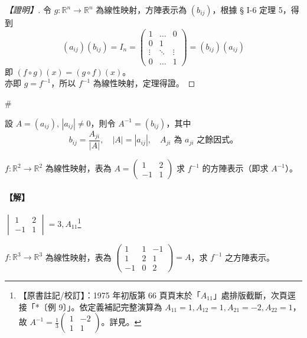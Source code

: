 \begin{proof}[【證明】]
令 $g: \mathbb{R}^n \longrightarrow \mathbb{R}^n$ 為線性映射，方陣表示為 $(b_{ij})$，根據 § I-6 定理 5，得到
\begin{equation}
(a_{ij})(b_{ij}) = I_n = \begin{pmatrix}
1 & \dots & 0 \\
0 & 1 & \\
\vdots & \ddots & \vdots \\
0 & \dots & 1
\end{pmatrix} = (b_{ij})(a_{ij}) \label{eq:b6s-1-7-10}
\end{equation}
即 $(f \circ g)(x) = (g \circ f)(x)$。\\
亦即 $g = f^{-1}$，所以 $f^{-1}$ 為線性映射，定理得證。
\end{proof}\hfill$\#$

\begin{definition*}\label{def:b6s-1-11}
設 $A=(a_{ij}),\, |a_{ij}| \ne 0$，則令 $A^{-1} = (b_{ij})$，其中
\[ b_{ij} = \dfrac{A_{ji}}{|A|},\quad |A|=|a_{ij}|,\quad A_{ji} \text{ 為 } a_{ji} \text{ 之餘因式。} \]
\end{definition*}

\begin{example}\label{ex:b6s-1-39b}
$f: \mathbb{R}^2 \longrightarrow \mathbb{R}^2$ 為線性映射，表為 $A = \begin{pmatrix} 1 & 2 \\ -1 & 1 \end{pmatrix}$ 求 $f^{-1}$ 的方陣表示（即求 $A^{-1}$）。
\end{example}

\paragraph{【解】}
$\begin{vmatrix} 1 & 2 \\ -1 & 1 \end{vmatrix} = 3, A_{11}$\label{note:b6s-ch1-p66-ex8}\footnote{【原書註記/校訂】：1975 年初版第 66 頁頁末於「$A_{11}$」處排版截斷，次頁逕接「*〔例 9〕」。依定義補記完整演算為 $A_{11}=1, A_{12}=1, A_{21}=-2, A_{22}=1$，故 $A^{-1} = \frac{1}{3}\begin{pmatrix} 1 & -2 \\ 1 & 1 \end{pmatrix}$。詳見\errataref。}

\begin{example}[*]\label{ex:b6s-1-40}
$f: \mathbb{R}^3 \longrightarrow \mathbb{R}^3$ 為線性映射，表為 $\begin{pmatrix} 1 & 1 & -1 \\ 1 & 2 & 1 \\ -1 & 0 & 2 \end{pmatrix} = A$，求 $f^{-1}$ 之方陣表示。
\end{example}

